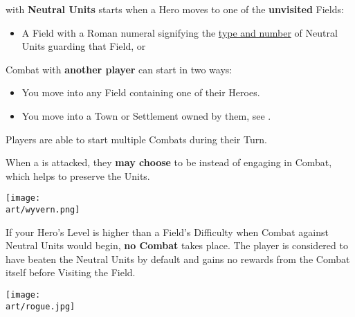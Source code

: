 
\begin{multicols*}{2}

 with \textbf{Neutral Units} starts when a Hero moves to one of the \textbf{unvisited} Fields:
\begin{itemize}
  \item A Field with a Roman numeral signifying the \hyperlink{Difficulty Table}{type and number} of Neutral Units guarding that Field, or
\end{itemize}

Combat with \textbf{another player} can start in two ways:
\begin{itemize}
  \item You move into any Field containing one of their Heroes.
  \item You move into a Town or Settlement owned by them, see .
\end{itemize}
Players are able to start multiple Combats during their Turn.

When a  is attacked, they \textbf{may choose} to be  instead of engaging in Combat, which helps to preserve the Units.

\begin{center}
  \texttt{[image: \\art/wyvern.png]}
\end{center}

If your Hero's Level is higher than a Field's Difficulty when Combat against Neutral Units would begin, \textbf{no Combat} takes place.
The player is considered to have beaten the Neutral Units by default and gains no rewards from the Combat itself before Visiting the Field.

\vspace*{\fill}

\begin{center}
  \texttt{[image: \\art/rogue.jpg]}
\end{center}
\end{multicols*}

